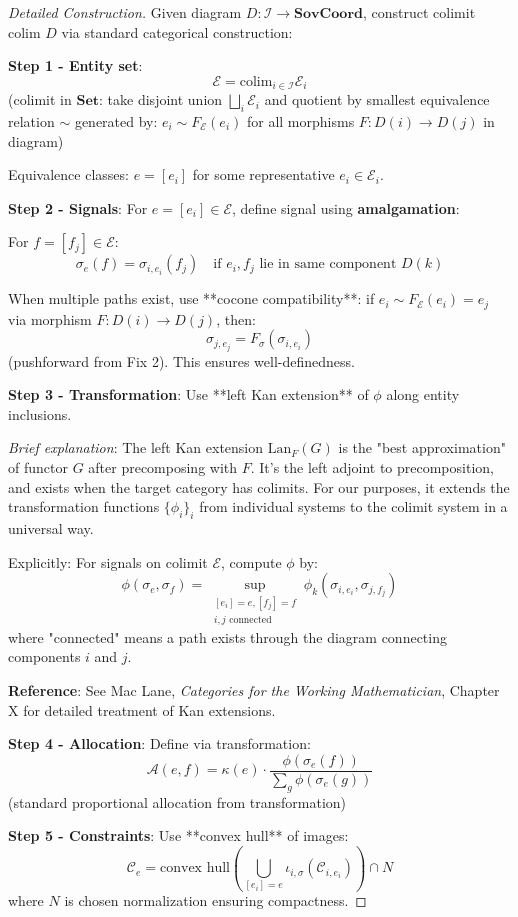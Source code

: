 \documentclass[11pt,a4paper]{article}
\theoremstyle{definition}
\theoremstyle{remark}
\newcommand{\E}{\mathcal{E}}
\newcommand{\A}{\mathcal{A}}
\newcommand{\C}{\mathcal{C}}
\newcommand{\SovCoord}{\mathbf{SovCoord}}
\begin{document}
\begin{proof}[Detailed Construction]
Given diagram $D: \mathcal{I} \to \SovCoord$, construct colimit $\text{colim } D$ via standard categorical construction:

\textbf{Step 1 - Entity set}:
\[ \E = \text{colim}_{i \in \mathcal{I}} \E_i \]
(colimit in $\mathbf{Set}$: take disjoint union $\bigsqcup_i \E_i$ and quotient by smallest equivalence relation $\sim$ generated by: $e_i \sim F_\E(e_i)$ for all morphisms $F: D(i) \to D(j)$ in diagram)

Equivalence classes: $e = [e_i]$ for some representative $e_i \in \E_i$.

\textbf{Step 2 - Signals}: For $e = [e_i] \in \E$, define signal using \textbf{amalgamation}:

For $f = [f_j] \in \E$:
\[ \sigma_e(f) = \sigma_{i,e_i}(f_j) \quad \text{if } e_i, f_j \text{ lie in same component } D(k) \]

When multiple paths exist, use **cocone compatibility**: if $e_i \sim F_\E(e_i) = e_j$ via morphism $F: D(i) \to D(j)$, then:
\[ \sigma_{j,e_j} = F_\sigma(\sigma_{i,e_i}) \]
(pushforward from Fix 2). This ensures well-definedness.

\textbf{Step 3 - Transformation}: Use **left Kan extension** of $\phi$ along entity inclusions.

\textit{Brief explanation}: The left Kan extension $\text{Lan}_F(G)$ is the "best approximation" of functor $G$ after precomposing with $F$. It's the left adjoint to precomposition, and exists when the target category has colimits. For our purposes, it extends the transformation functions $\{\phi_i\}_i$ from individual systems to the colimit system in a universal way.

Explicitly: For signals on colimit $\E$, compute $\phi$ by:
\[ \phi(\sigma_e, \sigma_f) = \sup_{\substack{[e_i]=e, [f_j]=f \\ i,j \text{ connected}}} \phi_k(\sigma_{i,e_i}, \sigma_{j,f_j}) \]
where "connected" means a path exists through the diagram connecting components $i$ and $j$.

\textbf{Reference}: See Mac Lane, \textit{Categories for the Working Mathematician}, Chapter X for detailed treatment of Kan extensions.

\textbf{Step 4 - Allocation}: Define via transformation:
\[ \A(e,f) = \kappa(e) \cdot \frac{\phi(\sigma_e(f))}{\sum_g \phi(\sigma_e(g))} \]
(standard proportional allocation from transformation)

\textbf{Step 5 - Constraints}: Use **convex hull** of images:
\[ \C_e = \text{convex hull}\left(\bigcup_{[e_i]=e} \iota_{i,\sigma}(\C_{i,e_i})\right) \cap N \]
where $N$ is chosen normalization ensuring compactness.


\end{proof}
\end{document}
